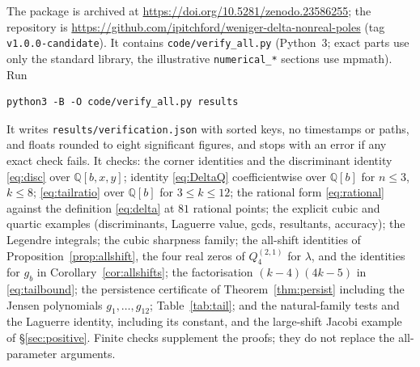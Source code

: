 \documentclass[11pt,a4paper]{article}
\theoremstyle{definition}
\theoremstyle{remark}
\begin{document}
The package is archived at \url{https://doi.org/10.5281/zenodo.23586255}; the repository is
\url{https://github.com/ipitchford/weniger-delta-nonreal-poles} (tag \texttt{v1.0.0-candidate}).
It contains \texttt{code/verify\_all.py} (Python~3; exact parts
use only the standard library, the illustrative \texttt{numerical\_*}
sections use mpmath). Run
\begin{verbatim}
python3 -B -O code/verify_all.py results
\end{verbatim}
It writes \texttt{results/verification.json} with sorted keys, no
timestamps or paths, and floats rounded to eight significant figures, and
stops with an error if any exact check fails. It checks: the corner
identities and the discriminant identity \eqref{eq:disc} over
$\mathbb Q[b,x,y]$; identity \eqref{eq:DeltaQ} coefficientwise over
$\mathbb Q[b]$ for $n\le3$, $k\le8$; \eqref{eq:tailratio} over $\mathbb Q[b]$
for $3\le k\le12$; the rational form \eqref{eq:rational} against the
definition \eqref{eq:delta} at $81$ rational points; the explicit cubic and
quartic examples (discriminants, Laguerre value, gcds, resultants,
accuracy); the Legendre integrals; the cubic sharpness family; the
all-shift identities of Proposition~\ref{prop:allshift}, the four real zeros
of $Q_4^{(2,1)}$ for $\lambda$, and the identities for $g_b$ in
Corollary~\ref{cor:allshifts}; the factorisation $(k-4)(4k-5)$ in
\eqref{eq:tailbound}; the persistence
certificate of Theorem~\ref{thm:persist} including the Jensen polynomials
$g_1,\dots,g_{12}$; Table~\ref{tab:tail}; and the natural-family tests and
the Laguerre identity, including its constant, and the large-shift Jacobi
example of \S\ref{sec:positive}. Finite checks supplement
the proofs; they do not replace the all-parameter arguments.
\end{document}
